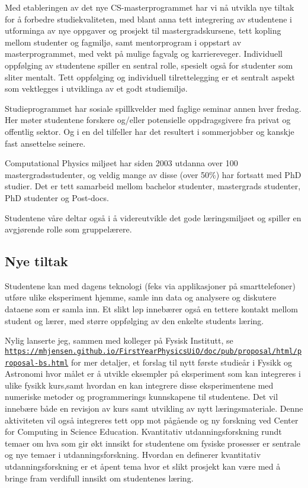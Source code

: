 \documentclass[aps,floatfix,preprint]{revtex4-1}
\begin{document}
\noindent
Med etableringen av det nye CS-masterprogrammet har vi nå utvikla nye
tiltak for å forbedre studiekvaliteten, med blant anna tett
integrering av studentene i utforminga av nye oppgaver og prosjekt til
mastergradskursene, tett kopling mellom studenter og fagmiljø, samt
mentorprogram i oppstart av masterprogrammet, med vekt på mulige fagvalg og
karriereveger. Individuell oppfølging av studentene spiller en sentral
rolle, spesielt også for studenter som sliter mentalt.  Tett
oppfølging og individuell tilrettelegging er et sentralt aspekt som
vektlegges i utviklinga av et godt studiemiljø.

Studieprogrammet har sosiale spillkvelder med faglige seminar annen
hver fredag. Her møter studentene  forskere og/eller potensielle
oppdragsgivere fra privat og offentlig sektor. Og i en del tilfeller
har det resultert i sommerjobber og kanskje fast ansettelse seinere.

Computational Physics miljøet har siden 2003 utdanna over 100
mastergradsstudenter, og veldig mange av disse (over 50\%) har
fortsatt med PhD studier. Det er tett samarbeid mellom bachelor
studenter, mastergrads studenter, PhD studenter og Post-docs.

Studentene våre deltar også i å videreutvikle det gode læringsmiljøet
og spiller en avgjørende rolle som gruppelærere.


\subsection*{Nye tiltak}

Studentene kan med dagens teknologi (feks via applikasjoner på
smarttelefoner) utføre ulike eksperiment hjemme, samle inn data og
analysere og diskutere dataene som er samla inn. Et slikt løp
innebærer også en tettere kontakt mellom student og lærer, med større oppfølging av
den enkelte students læring.



Nylig lanserte jeg, sammen med kolleger på Fysisk Institutt, se  \href{{https://mhjensen.github.io/FirstYearPhysicsUiO/doc/pub/proposal/html/proposal-bs.html}}{\nolinkurl{https://mhjensen.github.io/FirstYearPhysicsUiO/doc/pub/proposal/html/proposal-bs.html}} for mer detaljer,  et forslag til nytt første studieår i Fysikk og Astronomi
hvor målet er å utvikle eksempler på eksperiment som kan integreres i ulike
fysikk kurs,samt hvordan en kan integrere disse eksperimentene med
numeriske metoder og programmerings kunnskapene til studentene. Det
vil innebære både en revisjon av kurs samt utvikling av nytt
læringsmateriale. Denne aktiviteten vil også integreres tett opp mot
pågående og ny forskning ved Center for Computing in Science
Education. Kvantitativ utdanningsforskning rundt temaer om hva som gir
økt innsikt for studentene om fysiske prosesser er sentrale og nye
temaer i utdanningsforskning. Hvordan en definerer kvantitativ
utdanningsforskning er et åpent tema hvor et slikt prosjekt kan være
med å bringe fram verdifull innsikt om studentenes læring. 
\end{document}
